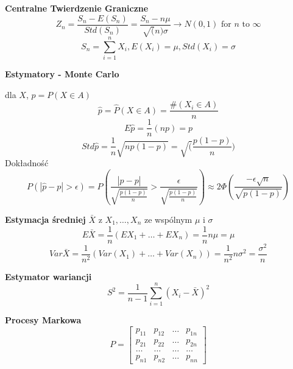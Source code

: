 \documentclass[a4paper]{article}
\begin{document}
    \textbf{Centralne Twierdzenie Graniczne}
    \begin{equation}
        Z_n = \frac{S_n - E(S_n)}{Std(S_n)} = \frac{S_n - n \mu}{\sqrt(n) \sigma} \rightarrow N(0,1) \text{ for } n \text{ to } \infty
    \end{equation}
    \begin{equation*}
        S_n = \sum_{i=1}^n X_i, E(X_i) = \mu, Std(X_i) = \sigma
    \end{equation*}

    \textbf{Estymatory - Monte Carlo}

    dla $X$, $p = P(X \in A)$
    \begin{equation*}
        \hat{p} = \hat{P}(X \in A) = \frac{\#(X_i \in A)}{n}
    \end{equation*}
    \begin{equation*}
        E \hat{p} = \frac{1}{n} (np) = p
    \end{equation*}
    \begin{equation*}
        Std \hat{p} = \frac{1}{n}\sqrt{np(1-p)} = \sqrt(\frac{p(1-p)}{n})
    \end{equation*}
    Dokładność
    \begin{equation*}
        P(|\hat{p} - p| > \epsilon) = P \left ( \frac{|\hat{p} - p|}{\sqrt{\frac{p(1-p)}{n}}} > \frac{\epsilon}{\sqrt{\frac{p(1-p)}{n}}} \right )
        \approx 2 \Phi \left ( \frac{-\epsilon \sqrt{n}}{\sqrt{p(1-p)}} \right)
    \end{equation*}

    \textbf{Estymacja średniej} $\bar{X}$ z $X_1, \dots, X_n$ ze wspólnym $\mu$ i $\sigma$
    \begin{equation*}
        E \bar{X} = \frac{1}{n} (EX_1 + \dots + EX_n) = \frac{1}{n} n\mu = \mu
    \end{equation*}
    \begin{equation*}
        Var \bar{X} = \frac{1}{n^2} (Var(X_1) + \dots + Var(X_n)) = \frac{1}{n^2} n\sigma^2 = \frac{\sigma^2}{n}
    \end{equation*}

    \textbf{Estymator wariancji}
    \begin{equation*}
        S^2 = \frac{1}{n-1} \sum_{i=1}^{n} (X_i - \bar{X})^2
    \end{equation*}

    \textbf{Procesy Markowa}
    \begin{equation*}
        P =
        \begin{bmatrix}
            p_{1 1} & p_{1 2} & \dots & p_{1 n}\\
            p_{2 1} & p_{2 2} & \dots & p_{2 n}\\
            \dots & \dots & \dots & \dots\\
            p_{n 1} & p_{n 2} & \dots & p_{n n}
        \end{bmatrix}
    \end{equation*}
\end{document}
